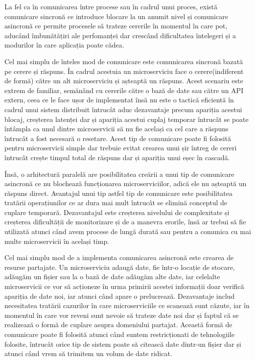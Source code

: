 La fel ca în comunicarea între procese sau în cadrul unui proces, există comunicare sincronă
ce introduce blocare la un anumit nivel și comunicare asincronă ce permite procesele să 
trateze cererile în momentul în care pot, aducând îmbunătățiri ale perfomanței dar crescând
dificultatea întelegeri și a modurilor în care aplicația poate cădea.

Cel mai simplu de înteles mod de comunicare este comunicarea sincronă bazată pe cerere și răspuns.
În cadrul acestuia un microserviciu face o cerere(indiferent de formă) către un alt microserviciu și așteaptă
un răspuns. Acest scenariu este extrem de familiar, semănând cu cererile către o bază de date sau către
un API extern, ceea ce le face ușor de implementat însă nu este o tactică eficientă în cadrul unui sistem distribuit
întrucât aduc dezavantaje precum apariția acestui blocaj, creșterea latenței dar și apariția
acestui cuplaj temporar întrucât se poate întâmpla ca unul dintre microservicii să nu fie același
ca cel care a răspuns întrucât a fost necesară o resetare. Acest tip de comunicare poate fi folosită
pentru microservicii simple dar trebuie evitat crearea unui șir întreg de cereri întrucât crește
timpul total de răspuns dar și apariția unui eșec în cascadă.

Însă, o arhitectură paralelă are posibilitatea creării a unui tip de comunicare asincronă ce
nu blochează funcționarea microserviciilor, adică ele nu așteaptă un răspuns direct. Avantajul
unui tip astfel tip de comunicare este posibilitatea tratării operațiunilor ce ar dura mai mult 
întrucât se elimină conceptul de cuplare temporară. Dezavantajul este creșterea nivelului de complexitate
și creșterea dificultății de monitorizare și de a manevra erorile, însă ar trebui să fie 
utilizată atunci când avem procese de lungă durată sau pentru a comunica cu mai multe microservicii 
în același timp.

Cel mai simplu mod de a implementa comunicarea asincronă este crearea de resurse partajate.
Un microserviciu adaugă date, fie într-o locație de stocare, adăugăm un fișier sau la o bază de date
adăugăm alte date, iar celelalte microservicii ce vor să acționeze în urma primirii acestei informații
doar verifică apariția de date noi, iar atunci când apare o prelucrează. Dezavantaje includ
necesitatea tratării cazurilor în care microserviciile ce scanează sunt căzute, iar în momentul
în care vor reveni sunt nevoie să trateze date noi dar și faptul că se realizează o formă
de cuplare asupra domeniului partajat. Această formă de comunicare poate fi folosită atunci 
când suntem restricționati de tehnologiile folosite, întrucât orice tip de sistem poate să
citească date dintr-un fișier dar și atunci când vrem să trimitem un volum de date ridicat.

